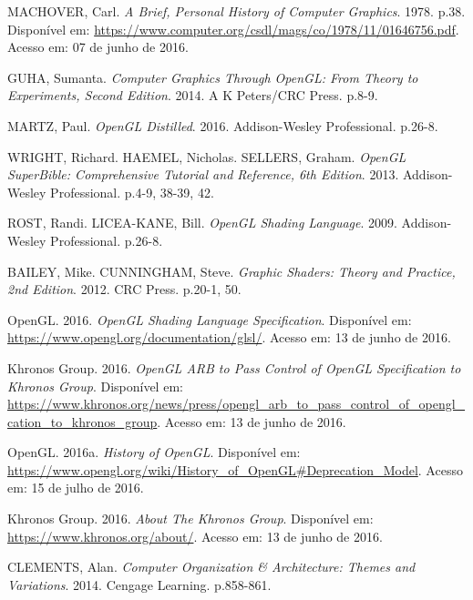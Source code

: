 \documentclass[brazil,ruledheader]{abntifes}
\begin{document}
\begin{thebibliography}{1}
\makeatletter
\renewcommand\@biblabel[1]{}
\makeatother

MACHOVER, Carl. \textit{A Brief, Personal History of Computer Graphics}. 1978. p.38. Disponível em: \url{https://www.computer.org/csdl/mags/co/1978/11/01646756.pdf}.
Acesso em: 07 de junho de 2016.

GUHA, Sumanta. \textit{Computer Graphics Through OpenGL: From Theory to Experiments, Second Edition}. 2014. A K Peters/CRC Press. p.8-9.

MARTZ, Paul. \textit{OpenGL Distilled}. 2016. Addison-Wesley Professional. p.26-8.

WRIGHT, Richard. HAEMEL, Nicholas. SELLERS, Graham. \textit{OpenGL SuperBible: Comprehensive Tutorial and Reference, 6th Edition}. 2013. Addison-Wesley Professional. p.4-9, 38-39, 42.

ROST, Randi. LICEA-KANE, Bill. \textit{OpenGL Shading Language}. 2009. Addison-Wesley Professional. p.26-8.


BAILEY, Mike. CUNNINGHAM, Steve. \textit{Graphic Shaders: Theory and Practice, 2nd Edition}. 2012. CRC Press. p.20-1, 50.

OpenGL. 2016. \textit{OpenGL Shading Language Specification}. Disponível em: \url{https://www.opengl.org/documentation/glsl/}.
Acesso em: 13 de junho de 2016.

Khronos Group. 2016. \textit{OpenGL ARB to Pass Control of OpenGL Specification to Khronos Group}. Disponível em: \url{https://www.khronos.org/news/press/opengl_arb_to_pass_control_of_opengl_cation_to_khronos_group}.
Acesso em: 13 de junho de 2016.

OpenGL. 2016a. \textit{History of OpenGL}. Disponível em: \url{https://www.opengl.org/wiki/History_of_OpenGL#Deprecation_Model}.
Acesso em: 15 de julho de 2016.

Khronos Group. 2016. \textit{About The Khronos Group}. Disponível em: \url{https://www.khronos.org/about/}.
Acesso em: 13 de junho de 2016.


CLEMENTS, Alan. \textit{Computer Organization \& Architecture: Themes and Variations}. 2014. Cengage Learning. p.858-861.


\end{thebibliography}
\end{document}
